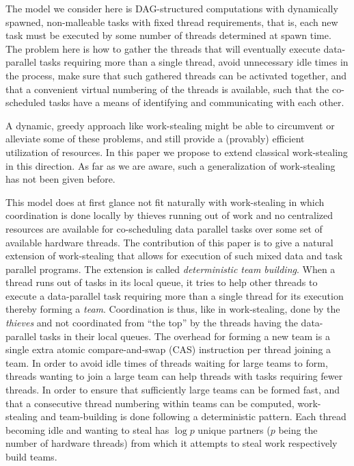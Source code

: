 \documentclass[preprint]{sigplanconf}
\begin{document}
The model we consider here is DAG-structured computations with
dynamically spawned, non-malleable tasks with fixed thread
requirements, that is, each new task must be executed by some number
of threads determined at spawn time. The problem here is how to gather
the threads that will eventually execute data-parallel tasks requiring
more than a single thread, avoid unnecessary idle times in the
process, make sure that such gathered threads can be activated
together, and that a convenient virtual numbering of the threads is
available, such that the co-scheduled tasks have a means of
identifying and communicating with each other.

A dynamic, greedy approach like work-stealing might be able to
circumvent or alleviate some of these problems, and still provide a
(provably) efficient utilization of resources.  In this paper we propose
to extend classical work-stealing in this direction. As far
as we are aware, such a generalization of work-stealing has not been
given before.

This model does at first glance not fit naturally with work-stealing
in which coordination is done locally by thieves running out of work
and no centralized resources are available for co-scheduling data
parallel tasks over some set of available hardware threads. The
contribution of this paper is to give a natural extension of
work-stealing that allows for execution of such mixed data and task
parallel programs. The extension is called \emph{deterministic team
building}. When a thread runs out of tasks in its local queue, it
tries to help other threads to execute a data-parallel task requiring
more than a single thread for its execution thereby forming a
\emph{team}. Coordination is thus, like in work-stealing, done by the
\emph{thieves} and not coordinated from ``the top'' by the threads
having the data-parallel tasks in their local queues. The overhead for
forming a new team is a single extra atomic compare-and-swap (CAS)
instruction per thread joining a team. In order to avoid idle times of
threads waiting for large teams to form, threads wanting to join a
large team can help threads with tasks requiring fewer threads. In
order to ensure that sufficiently large teams can be formed fast, and
that a consecutive thread numbering within teams can be computed,
work-stealing and team-building is done following a deterministic
pattern. Each thread becoming idle and wanting to steal has $\log p$
unique partners ($p$ being the number of hardware threads) from which
it attempts to steal work respectively build teams.
\end{document}
